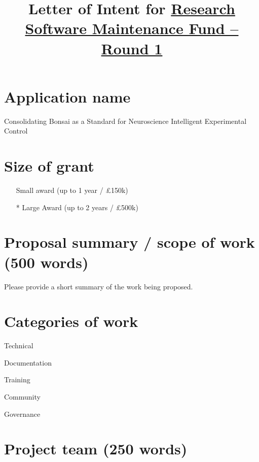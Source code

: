 \documentclass[12pt]{article}
\title{Letter of Intent for \href{https://www.software.ac.uk/research-software-maintenance-fund/round-1}{Research Software Maintenance Fund -- Round 1}}
\author{}
\makeatletter
\newcommand*{\radiobutton}{%
  \@ifstar{\@radiobutton0}{\@radiobutton1}%
}
\newcommand*{\@radiobutton}[1]{%
  \begin{tikzpicture}
    \pgfmathsetlengthmacro\radius{height("X")/2}
    \draw[radius=\radius] circle;
    \ifcase#1 \fill[radius=.6*\radius] circle;\fi
  \end{tikzpicture}%
}
\newcommand{\cmark}{\ding{51}}%
\newcommand{\done}{\rlap{$\square$}{\raisebox{2pt}{\large\hspace{1pt}\cmark}}%
\hspace{-2.5pt}}
\newenvironment{instruction}{\par\color{red}}{\par}
\makeatother
\begin{document}
\maketitle

\section{Application name}

Consolidating Bonsai as a Standard for Neuroscience Intelligent Experimental Control

\section{Size of grant}

\begin{itemize}
\item[\radiobutton] Small award (up to 1 year / £150k)
\item[\radiobutton*] Large Award (up to 2 years / £500k)
\end{itemize}

\section{Proposal summary / scope of work (500 words)}

\begin{instruction}

Please provide a short summary of the work being proposed.

\end{instruction}



\section{Categories of work}

\begin{todolist}
	\item Technical
	\item[\done] Documentation
	\item[\done] Training
	\item[\done] Community
    \item[\done] Governance
\end{todolist}

\section{Project team (250 words)}
\end{document}
